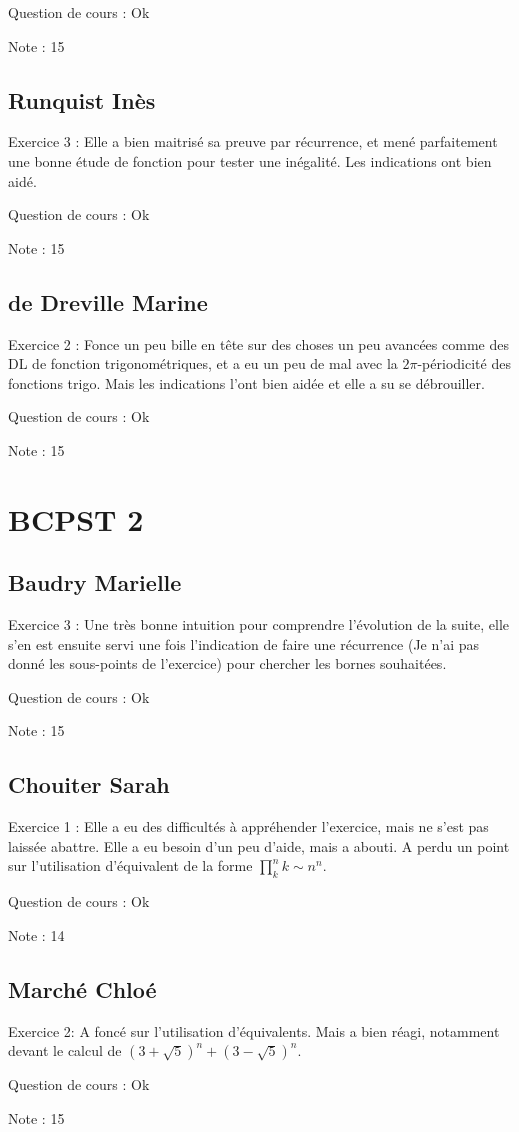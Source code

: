 \documentclass{article}
\begin{document}
Question de cours : Ok

Note : 15
\subsection{Runquist Inès}
Exercice 3 : Elle a bien maitrisé sa preuve par récurrence, et mené parfaitement une bonne étude de fonction pour tester une inégalité. Les indications ont bien aidé.

Question de cours : Ok

Note : 15
\subsection{de Dreville Marine}
Exercice 2 : Fonce un peu bille en tête sur des choses un peu avancées comme des DL de fonction trigonométriques, et a eu un peu de mal avec la $2\pi$-périodicité des fonctions trigo. Mais les indications l'ont bien aidée et elle a su se débrouiller. 

Question de cours : Ok

Note : 15
\section{BCPST 2}
\subsection{Baudry Marielle}
Exercice 3 : Une très bonne intuition pour comprendre l'évolution de la suite, elle s'en est ensuite servi une fois l'indication de faire une récurrence (Je n'ai pas donné les sous-points de l'exercice) pour chercher les bornes souhaitées.

Question de cours : Ok

Note : 15
\subsection{Chouiter Sarah}
Exercice 1 : Elle a eu des difficultés à appréhender l'exercice, mais ne s'est pas laissée abattre. Elle a eu besoin d'un peu d'aide, mais a abouti. A perdu un point sur l'utilisation d'équivalent de la forme $\prod_{k}^{n} k \sim n^n$.

Question de cours : Ok

Note : 14
\subsection{Marché Chloé}
Exercice 2: A foncé sur l'utilisation d'équivalents. Mais a bien réagi, notamment devant le calcul de $(3 + \sqrt{5})^n + (3 - \sqrt{5})^n$.

Question de cours : Ok

Note : 15
\end{document}
